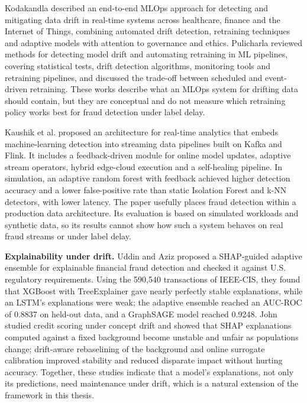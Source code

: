 Kodakandla \cite{kodakandla2024} described an end-to-end MLOps approach for detecting and mitigating data drift in real-time systems across healthcare, finance and the Internet of Things, combining automated drift detection, retraining techniques and adaptive models with attention to governance and ethics. Pulicharla \cite{pulicharla2019} reviewed methods for detecting model drift and automating retraining in ML pipelines, covering statistical tests, drift detection algorithms, monitoring tools and retraining pipelines, and discussed the trade-off between scheduled and event-driven retraining. These works describe what an MLOps system for drifting data should contain, but they are conceptual and do not measure which retraining policy works best for fraud detection under label delay.

Kaushik et al. \cite{kaushik2025} proposed an architecture for real-time analytics that embeds machine-learning detection into streaming data pipelines built on Kafka and Flink. It includes a feedback-driven module for online model updates, adaptive stream operators, hybrid edge-cloud execution and a self-healing pipeline. In simulation, an adaptive random forest with feedback achieved higher detection accuracy and a lower false-positive rate than static Isolation Forest and k-NN detectors, with lower latency. The paper usefully places fraud detection within a production data architecture. Its evaluation is based on simulated workloads and synthetic data, so its results cannot show how such a system behaves on real fraud streams or under label delay.

\textbf{Explainability under drift.} Uddin and Aziz \cite{uddin2026} proposed a SHAP-guided adaptive ensemble for explainable financial fraud detection and checked it against U.S. regulatory requirements. Using the 590,540 transactions of IEEE-CIS, they found that XGBoost with TreeExplainer gave nearly perfectly stable explanations, while an LSTM's explanations were weak; the adaptive ensemble reached an AUC-ROC of 0.8837 on held-out data, and a GraphSAGE model reached 0.9248. John \cite{john2025} studied credit scoring under concept drift and showed that SHAP explanations computed against a fixed background become unstable and unfair as populations change; drift-aware rebaselining of the background and online surrogate calibration improved stability and reduced disparate impact without hurting accuracy. Together, these studies indicate that a model's explanations, not only its predictions, need maintenance under drift, which is a natural extension of the framework in this thesis.

